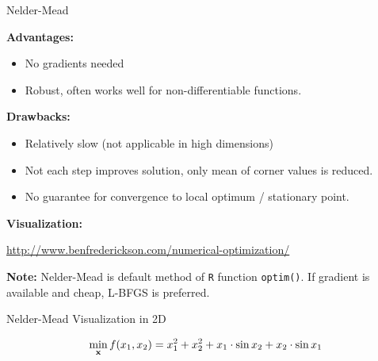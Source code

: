 \documentclass[11pt,compress,t,notes=noshow, xcolor=table]{beamer}
\begin{document}
\begin{vbframe}{Nelder-Mead}
\small

\textbf{Advantages:}
\begin{itemize}
\item No gradients needed
\item Robust, often works well for non-differentiable functions.
\end{itemize}
\textbf{Drawbacks:}
\begin{itemize}
\item Relatively slow (not applicable in high dimensions)
\item Not each step improves solution, only mean of corner values is reduced.
\item No guarantee for convergence to local optimum / stationary point.
\end{itemize}

\textbf{Visualization:}
\begin{center}
\url{http://www.benfrederickson.com/numerical-optimization/}
\end{center}

\vspace{0.3cm}
\textbf{Note:} Nelder-Mead is default method of \texttt{R} function \texttt{optim()}.
If gradient is available and cheap, L-BFGS is preferred.

\end{vbframe}


\begin{frame}{Nelder-Mead Visualization in 2D}

$$\min_{\mathbf{x}} f(x_1,x_2) = x_1^{2} + x_2^{2} + x_1\cdot \sin x_2 + x_2 \cdot \sin x_1 $$ 



\end{frame}
\end{document}
